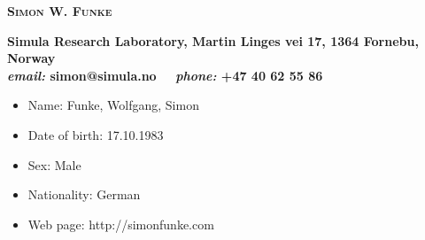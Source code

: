 \documentclass[11pt]{article}
\newcommand{\makeheading}[1]%
        {\hspace*{-\marginparsep minus \marginparwidth}%
         \begin{minipage}[t]{\textwidth+\marginparwidth+\marginparsep}%
                {\begin{center} \LARGE \bfseries\textsc{ #1} \end{center}}%
        \end{minipage}}
\newcommand{\address}[3]%
        {\hspace*{-\marginparsep minus \marginparwidth}%
         \begin{minipage}[t]{\textwidth+\marginparwidth+\marginparsep}%
                {\begin{center} \vspace{0.25cm} \textnormal \bfseries #1 \\ \textit{email: } #2 ~~\textit{phone: } #3 \end{center}}%
        \end{minipage}}
\begin{document}
\makeheading{Simon W. Funke}
\address{Simula Research Laboratory, Martin Linges vei 17, 1364 Fornebu, Norway}{simon@simula.no}{+47 40 62 55 86}

\newlength{\rcollength}\setlength{\rcollength}{1.0in}%


\begin{itemize}
\item[] Name: Funke, Wolfgang, Simon
    \vspace{-0.2cm}
\item[] Date of birth: 17.10.1983
    \vspace{-0.2cm}
\item[] Sex: Male
    \vspace{-0.2cm}
\item[] Nationality: German
    \vspace{-0.2cm}
\item[] Web page: http://simonfunke.com
\end{itemize}

\end{document}
